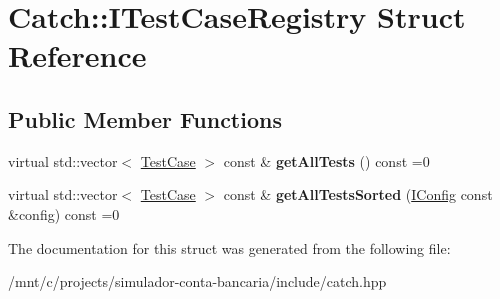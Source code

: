 \hypertarget{structCatch_1_1ITestCaseRegistry}{}\section{Catch\+:\+:I\+Test\+Case\+Registry Struct Reference}
\label{structCatch_1_1ITestCaseRegistry}
\subsection*{Public Member Functions}
\begin{DoxyCompactItemize}
\item 
\mbox{\label{structCatch_1_1ITestCaseRegistry_ad6e4d4a621655123f73ae98cfeda063d}} 
virtual std\+::vector$<$ \hyperlink{classCatch_1_1TestCase}{Test\+Case} $>$ const  \& {\bfseries get\+All\+Tests} () const =0
\item 
\mbox{\label{structCatch_1_1ITestCaseRegistry_a33e46639d0319d35497c05bb5d02be5a}} 
virtual std\+::vector$<$ \hyperlink{classCatch_1_1TestCase}{Test\+Case} $>$ const  \& {\bfseries get\+All\+Tests\+Sorted} (\hyperlink{structCatch_1_1IConfig}{I\+Config} const \&config) const =0
\end{DoxyCompactItemize}


The documentation for this struct was generated from the following file\+:\begin{DoxyCompactItemize}
\item 
/mnt/c/projects/simulador-\/conta-\/bancaria/include/catch.\+hpp\end{DoxyCompactItemize}
